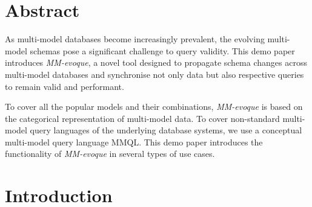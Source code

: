 


\section*{Abstract}

As multi-model databases become increasingly prevalent, the evolving multi-model schemas pose a significant challenge to query validity. This demo paper introduces \textit{MM-evoque}, a novel tool designed to propagate schema changes across multi-model databases and synchronise not only data but also respective queries to remain valid and performant. 

To cover all the popular models and their combinations, \textit{MM-evoque} is based on the categorical representation of multi-model data. To cover non-standard multi-model query languages of the underlying database systems, we use a conceptual multi-model query language MMQL. This demo paper introduces the functionality of \textit{MM-evoque} in several types of use cases.




\section{Introduction}




